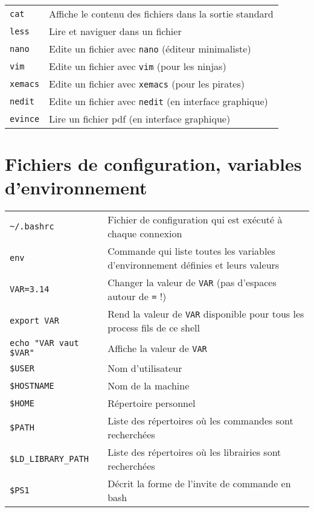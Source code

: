 \documentclass [a4paper]{article}
\begin{document}
\begin{tabular}{ ll }
\hline
{\verb+cat+}    & Affiche le contenu des fichiers dans la sortie standard\\
{\verb+less+}   & Lire et naviguer dans un fichier\\
{\verb+nano+}   & Edite un fichier avec \verb+nano+ (éditeur minimaliste)\\
{\verb+vim+}    & Edite un fichier avec \verb+vim+ (pour les ninjas)\\
{\verb+xemacs+} & Edite un fichier avec \verb+xemacs+ (pour les pirates)\\
{\verb+nedit+}  & Edite un fichier avec \verb+nedit+ (en interface graphique)\\
{\verb+evince+} & Lire un fichier pdf (en interface graphique)\\
\hline
\end{tabular}

\section*{Fichiers de configuration, variables d'environnement}

\begin{tabular}{ll}
\hline
{\verb+~/.bashrc+}                              & Fichier de configuration qui est exécuté à chaque connexion\\
{\verb+env+}                                    & Commande qui liste toutes les variables d'environnement définies et leurs valeurs\\
{\verb+VAR=3.14+}                               & Changer la valeur de \verb+VAR+ (pas d'espaces autour de \verb+=+ !)\\
{\verb+export VAR+}                             & Rend la valeur de \verb+VAR+ disponible pour tous les process fils de ce shell\\
{\verb+echo "VAR vaut $VAR"+}                   & Affiche la valeur de \verb+VAR+\\
{\verb+$USER+}                                   & Nom d'utilisateur\\
{\verb+$HOSTNAME+}                               & Nom de la machine\\
{\verb+$HOME+}                                   & Répertoire personnel\\
{\verb+$PATH+}                                   & Liste des répertoires où les commandes sont recherchées\\
{\verb+$LD_LIBRARY_PATH+}                        & Liste des répertoires où les librairies sont recherchées\\
{\verb+$PS1+}                                    & Décrit la forme de l'invite de commande en bash\\

\hline
\end{tabular}
\end{document}
